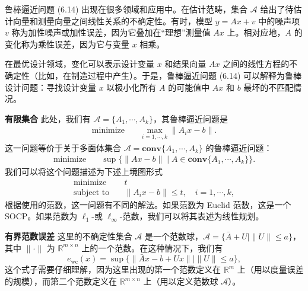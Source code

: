\documentclass[UTF8,12pt,a4paper,fontset=fandol]{ctexart}
\begin{document}
鲁棒逼近问题 (6.14) 出现在很多领域和应用中。在估计范畴，集合 $\mathcal{A}$ 给出了待估计向量和测量向量之间线性关系的不确定性。有时，模型 $y=Ax+v$ 中的噪声项 $v$ 称为加性噪声或加性误差，因为它叠加在“理想”测量值 $Ax$ 上。相对应地，$A$ 的变化称为乘性误差，因为它与变量 $x$ 相乘。

在最优设计领域，变化可以表示设计变量 $x$ 和结果向量 $Ax$ 之间的线性方程的不确定性（比如，在制造过程中产生）。于是，鲁棒逼近问题 (6.14) 可以解释为鲁棒设计问题：寻找设计变量 $x$ 以极小化所有 $A$ 的可能值中 $Ax$ 和 $b$ 最坏的不匹配情况。

\noindent\textbf{有限集合}\quad
此处，我们有 $\mathcal{A}=\{A_1,\cdots,A_k\}$，其鲁棒逼近问题是
\[
\begin{aligned}
\text{minimize}\quad & \max_{i=1,\cdots,k}\|A_ix-b\|.
\end{aligned}
\]
这一问题等价于关于多面体集合 $\mathcal{A}=\mathbf{conv}\{A_1,\cdots,A_k\}$ 的鲁棒逼近问题：
\[
\begin{aligned}
\text{minimize}\quad & \sup\{\|Ax-b\|\mid A\in\mathbf{conv}\{A_1,\cdots,A_k\}\}.
\end{aligned}
\]
我们可以将这个问题描述为下述上境图形式
\[
\begin{aligned}
\text{minimize}\quad & t\\
\text{subject to}\quad & \|A_ix-b\|\leq t,\quad i=1,\cdots,k,
\end{aligned}
\]
根据使用的范数，这一问题有不同的解法。如果范数为 Euclid 范数，这是一个 SOCP。如果范数为 $\ell_1$-或 $\ell_\infty$-范数，我们可以将其表述为线性规划。

\noindent\textbf{有界范数误差}\quad
这里的不确定性集合 $\mathcal{A}$ 是一个范数球，$\mathcal{A}=\{\bar{A}+U\mid \|U\|\leq a\}$，其中 $\|\cdot\|$ 为 $\mathbb{R}^{m\times n}$ 上的一个范数。在这种情况下，我们有
\[
e_{\mathrm{wc}}(x)=\sup\{\|\bar{A}x-b+Ux\|\mid \|U\|\leq a\},
\]
这个式子需要仔细理解，因为这里出现的第一个范数定义在 $\mathbb{R}^m$ 上（用以度量误差的规模），而第二个范数定义在 $\mathbb{R}^{m\times n}$ 上（用以定义范数球 $\mathcal{A}$）。
\end{document}
